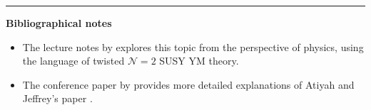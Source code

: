

\vspace{5mm}
\hrule 
\vspace{5mm}

\textbf{Bibliographical notes}
{\small
\begin{itemize}
	\item The lecture notes by \citet{cordes95} explores this topic from the
	perspective of physics, using the language of twisted 
	$\mathcal{N}=2$ SUSY YM theory.
	\item The conference paper by \citet{naber} provides more detailed
	explanations of Atiyah and Jeffrey's paper \cite{atiyahlagrangians}.
\end{itemize}
}


